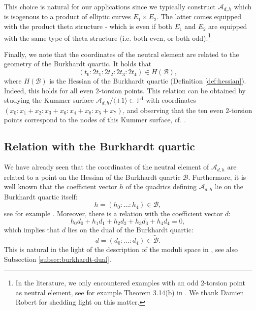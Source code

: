 \documentclass[11pt]{amsart}
\theoremstyle{definition}
\newcommand{\B}{\mathcal{B}}
\newcommand{\A}{\mathcal{A}}
\newcommand{\PP}{\mathbb{P}}
\begin{document}
This choice is natural for our applications since we typically construct $\A_{d,h}$ which is isogenous to a product of elliptic curves $E_1 \times E_2$. The latter comes equipped with the product theta structure - which is even if both $E_1$ and $E_2$ are equipped with the same type of theta structure (i.e. both even, or both odd).\footnote{In the literature, we only encountered examples with an odd $2$-torsion point as neutral element, see for example Theorem 3.14(b) in \cite{gruson2015alternating}. We thank Damien Robert for shedding light on this matter.}

Finally, we note that the coordinates of the neutral element are related to the geometry of the Burkhardt quartic. It holds that
\begin{equation} \label{eq:hessian-relation}
	(t_0 : 2t_1 : 2t_2 : 2t_3 : 2t_4) \in H(\B),
\end{equation}
where $H(\B)$ is the Hessian of the Burkhardt quartic (Definition \ref{def:hessian}). Indeed, this holds for all even $2$-torsion points. This relation can be obtained by studying the Kummer surface $\A_{d,h}/\langle \pm 1\rangle \subset \PP^4$ with coordinates $(x_0:x_1+x_2:x_3+x_6:x_4+x_8:x_5+x_7)$, and observing that the ten even $2$-torsion points correspond to the nodes of this Kummer surface,  cf. \cite[Section 5.3]{hunt2006burkhardt}. 

\subsection{Relation with the Burkhardt quartic} \label{subsec:relations-burkhardt}

We have already seen that the coordinates of the neutral element of $\A_{d,h}$ are related to a point on the Hessian of the Burkhardt quartic $\B$. Furthermore, it is well known that the coefficient vector $h$ of the quadrics defining $\A_{d,h}$ lie on the Burkhardt quartic itself:
\begin{equation} \label{eq:h-on-B}
h = (h_0: \dots :h_4) \in \B,
\end{equation}
see for example \cite[Section 5.3.1]{hunt2006burkhardt}.  Moreover, there is a relation with the coefficient vector $d$:
\begin{equation*}
h_0 d_0 + h_1 d_1 + h_2 d_2 + h_3 d_3 + h_4 d_4 = 0,
\end{equation*}
\cite[Equation 8.3]{gunji2006defining} which implies that $d$ lies on the dual of the Burkhardt quartic:
\begin{equation} \label{eq:d-on-Bd}
d = (d_0:\dots:d_4) \in \tilde{\B}.
\end{equation}
This is natural in the light of the description of the moduli space in \cite{freitag2004burkhardt1}, see also Subsection \ref{subsec:burkhardt-dual}. 
\end{document}
